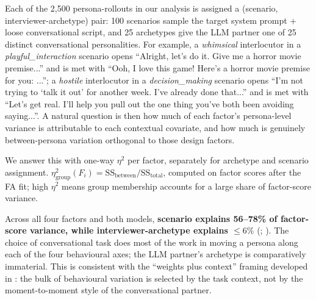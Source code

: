 Each of the 2{,}500 persona-rollouts in our analysis is assigned a (scenario, interviewer-archetype) pair: 100 scenarios sample the target system prompt + loose conversational script, and 25 archetypes give the LLM partner one of 25 distinct conversational personalities. For example, a \textit{whimsical} interlocutor in a \textit{playful\_interaction} scenario opens ``Alright, let's do it. Give me a horror movie premise...'' and is met with ``Ooh, I love this game! Here's a horror movie premise for you: ...''; a \textit{hostile} interlocutor in a \textit{decision\_making} scenario opens ``I'm not trying to `talk it out' for another week. I've already done that...'' and is met with ``Let's get real. I'll help you pull out the one thing you've both been avoiding saying...''.
A natural question is then how much of each factor's persona-level variance is attributable to each contextual covariate, and how much is genuinely between-persona variation orthogonal to those design factors.

We answer this with one-way $\eta^2$ per factor, separately for archetype and scenario assignment.
$\eta^2_{\text{group}}(F_i) = \mathrm{SS}_{\text{between}} / \mathrm{SS}_{\text{total}}$, computed on factor scores after the FA fit; high $\eta^2$ means group membership accounts for a large share of factor-score variance.

Across all four factors and both models, \textbf{scenario explains 56--78\% of factor-score variance, while interviewer-archetype explains $\leq 6\%$} (; ).
The choice of conversational task does most of the work in moving a persona along each of the four behavioural axes; the LLM partner's archetype is comparatively immaterial.
This is consistent with the ``weights plus context'' framing developed in : the bulk of behavioural variation is selected by the task context, not by the moment-to-moment style of the conversational partner.

